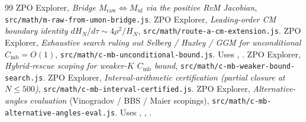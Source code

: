 \documentclass[11pt]{article}
\theoremstyle{definition}
\begin{document}
\begin{thebibliography}{99}
 ZPO Explorer, \textit{Bridge $M_{\text{raw}} \Leftrightarrow M_{\text{uf}}$ via the positive RvM Jacobian}, \texttt{src/math/m-raw-from-umon-bridge.js}.
 ZPO Explorer, \textit{Leading-order CM boundary identity $dH_N/d\tau \sim 4 \rho^2 / H_N$}, \texttt{src/math/route-a-cm-extension.js}.
 ZPO Explorer, \textit{Exhaustive search ruling out Selberg / Huxley / GGM for unconditional $C_{\text{mb}} = O(1)$}, \texttt{src/math/c-mb-unconditional-bound.js}. Uses \cite{esy-2011}, \cite{montgomery-1973}.
 ZPO Explorer, \textit{Hybrid-rescue scoping for weaker-$K$ $C_{\text{mb}}$ bound}, \texttt{src/math/c-mb-weaker-bound-search.js}.
 ZPO Explorer, \textit{Interval-arithmetic certification (partial closure at $N \leq 500$)}, \texttt{src/math/c-mb-interval-certified.js}.
 ZPO Explorer, \textit{Alternative-angles evaluation} (Vinogradov / BBS / Maier scopings), \texttt{src/math/c-mb-alternative-angles-eval.js}. Uses \cite{bourgain-demeter-guth-2016}, \cite{bondarenko-seip-2013}, \cite{maier-1988}.

\end{thebibliography}
\end{document}
